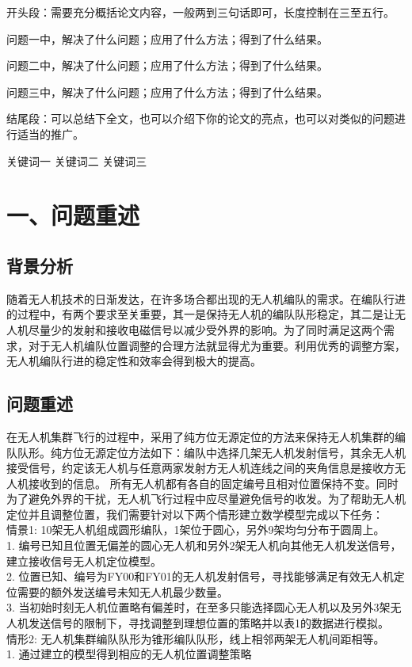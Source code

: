 \documentclass{my_paper}
\begin{document}
\newpage

\begin{center}
\lunwenbiaoti

\vspace{2ex}
\zhaiyao
\end{center}

开头段：需要充分概括论文内容，一般两到三句话即可，长度控制在三至五行。

问题一中，解决了什么问题；应用了什么方法；得到了什么结果。

问题二中，解决了什么问题；应用了什么方法；得到了什么结果。

问题三中，解决了什么问题；应用了什么方法；得到了什么结果。

结尾段：可以总结下全文，也可以介绍下你的论文的亮点，也可以对类似的问题进行适当的推广。

\begin{guanjianci}
关键词一 \quad 关键词二 \quad 关键词三
\end{guanjianci}

\newpage
\section{一、问题重述}
\subsection{背景分析}
随着无人机技术的日渐发达，在许多场合都出现的无人机编队的需求。在编队行进的过程中，有两个要求至关重要，其一是保持无人机的编队队形稳定，其二是让无人机尽量少的发射和接收电磁信号以减少受外界的影响。为了同时满足这两个需求，对于无人机编队位置调整的合理方法就显得尤为重要。利用优秀的调整方案，无人机编队行进的稳定性和效率会得到极大的提高。
\subsection{问题重述}
在无人机集群飞行的过程中，采用了纯方位无源定位的方法来保持无人机集群的编队队形。纯方位无源定位方法如下：编队中选择几架无人机发射信号，其余无人机接受信号，约定该无人机与任意两家发射方无人机连线之间的夹角信息是接收方无人机接收到的信息。
所有无人机都有各自的固定编号且相对位置保持不变。同时为了避免外界的干扰，无人机飞行过程中应尽量避免信号的收发。为了帮助无人机定位并且调整位置，我们需要针对以下两个情形建立数学模型完成以下任务：\\
情景1: 10架无人机组成圆形编队，1架位于圆心，另外9架均匀分布于圆周上。  \\
1. 编号已知且位置无偏差的圆心无人机和另外2架无人机向其他无人机发送信号，建立接收信号无人机定位模型。 \\
2. 位置已知、编号为FY00和FY01的无人机发射信号，寻找能够满足有效无人机定位需要的额外发送编号未知无人机最少数量。 \\
3. 当初始时刻无人机位置略有偏差时，在至多只能选择圆心无人机以及另外3架无人机发送信号的限制下，寻找调整到理想位置的策略并以表1的数据进行模拟。 \\
情形2: 无人机集群编队队形为锥形编队队形，线上相邻两架无人机间距相等。 \\
1. 通过建立的模型得到相应的无人机位置调整策略
\end{document}

